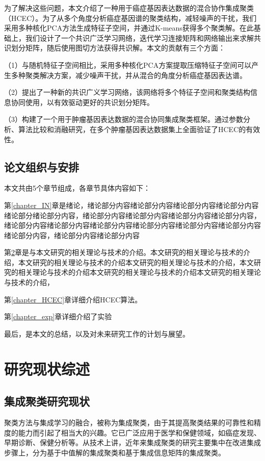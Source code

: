 \documentclass[unicode,pdfcover]{hquthesis}
\begin{document}
为了解决这些问题，本文介绍了一种用于癌症基因表达数据的混合协作集成聚类（HCEC）。为了从多个角度分析癌症基因谱的聚类结构，减轻噪声的干扰，我们采用多种核化PCA方法生成特征子空间，并通过K-means获得多个聚类解。在此基础上，我们设计了一个共识广泛学习网络，迭代学习连接矩阵和网络输出来求解共识划分矩阵，随后使用图切方法获得共识解。本文的贡献有三个方面：

（1）与随机特征子空间相比，采用多种核化PCA方案提取压缩特征子空间可以产生多种聚类解决方案，减少噪声干扰，并从混合的角度分析癌症基因表达谱。

（2）提出了一种新的共识广义学习网络，该网络将多个特征子空间和聚类结构信息协同使用，以有效驱动更好的共识划分矩阵。

（3）构建了一个用于肿瘤基因表达数据的混合协同集成聚类框架。通过参数分析、算法比较和消融研究，在多个肿瘤基因表达数据集上全面验证了HCEC的有效性。

\section{论文组织与安排}
本文共由5个章节组成，各章节具体内容如下：

第\ref{chapter_IN}章是绪论，绪论部分内容绪论部分内容绪论部分内容绪论部分内容绪论部分绪论部分内容，绪论部分内容绪论部分内容绪论部分内容绪论部分内容，绪论部分内容绪论部分内容绪论部分内容绪论部分内容绪论部分内容绪论部分内容绪论部分内容，绪论部分内容绪论部分内容

第\ref{chapter_RW}章是与本文研究的相关理论与技术的介绍。本文研究的相关理论与技术的介绍，本文研究的相关理论与技术的介绍本文研究的相关理论与技术的介绍，本文研究的相关理论与技术的介绍本文研究的相关理论与技术的介绍本文研究的相关理论与技术的介绍，

第\ref{chapter_HCEC}章详细介绍HCEC算法。

第\ref{chapter_exp}章详细介绍了实验

最后，是本文的总结，以及对未来研究工作的计划与展望。



\chapter{研究现状综述}\label{chapter_RW}
\section{集成聚类研究现状}

聚类方法与集成学习的融合，被称为集成聚类，由于其提高聚类结果的可靠性和精度的能力而引起了相当大的兴趣。它已广泛应用于医学和保健领域，如癌症发现\cite{Yu2011Knowledge,Agrawal2019Combining}、早期诊断\cite{Kausar2016Ensemble}、保健分析\cite{Dai2021An}等。从技术上讲，近年来集成聚类的研究主要集中在改进集成步骤上，分为基于中值解的集成聚类和基于集成信息矩阵的集成聚类。
\end{document}
